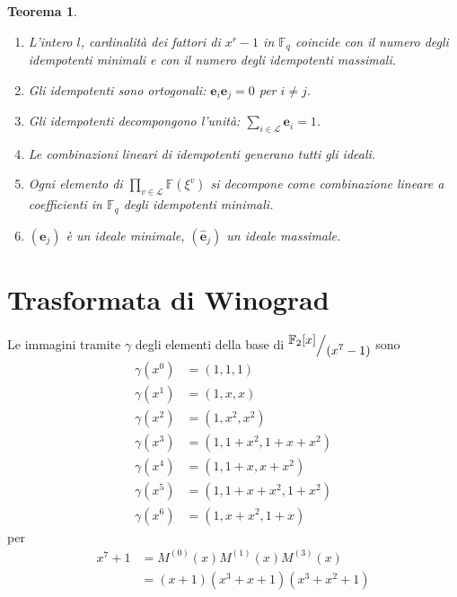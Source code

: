 \documentclass[mathserif]{beamer}
\def\quotient#1#2{%
   \raise1ex\hbox{$#1$}\Big/\lower1ex\hbox{$#2$}%
}
\newtheorem{teorema}{Teorema}
\begin{document}
\begin{frame}
\begin{teorema}
   \begin{enumerate}
      \item L'intero $l$, cardinalità dei fattori di $x^r-1$ in $\mathbb{F}_{q}$ coincide con il numero degli idempotenti minimali e con il numero degli idempotenti massimali.
      \item Gli idempotenti sono ortogonali: $\mathbf{e}_{i}\mathbf{e}_{j}  = \mathfrak{0}$ per $i \neq j$.
      \item Gli idempotenti decompongono l'unità: $\sum_{i \in \mathscr{L}}\mathbf{e}_{i}  = \mathfrak{1}$.
      \item Le combinazioni lineari di idempotenti generano tutti gli ideali.
      \item Ogni elemento di $ \prod_{v\in \mathscr{L}} \mathbb{F}(\xi^{v})$ si decompone come combinazione lineare a coefficienti in $\mathbb{F}_{q}$ degli idempotenti minimali.
      \item $(\mathbf{e}_{j})$ è un ideale minimale, $(\mathbf{\hat{e}}_{j})$ un ideale massimale.
   \end{enumerate}
\end{teorema}
\end{frame}


\section{Trasformata di Winograd}

\thispagestyle{empty}
\begin{frame}
   \vspace{-1.2cm}
    Le immagini tramite $\gamma$ degli elementi della base di $ \quotient{\mathbb{F}_{2} \lbrack x \rbrack  }{ (x^{7} - 1)}$ sono
    \begin{align*}   
      \gamma(x^0) &= (1,1,1)  \\
      \gamma(x^1) &= (1,x,x) \\
      \gamma(x^2) &= (1,x^2,x^2)  \\
      \gamma(x^3) &= (1,1+x^2,1+x+x^2)  \\
      \gamma(x^4) &= (1,1+x,x+x^2)  \\
      \gamma(x^5) &= (1,1+x+x^2,1+x^2)  \\
      \gamma(x^6) &= (1,x+x^2,1+x) 
    \end{align*}
    per 
    \begin{align*}
      x^{7} + 1 &= M^{(0)}(x) M^{(1)}(x) M^{(3)}(x) \\
		&= (x+1)(x^3 + x + 1)(x^3 + x^2 + 1) 
    \end{align*}
\end{frame}
\end{document}
